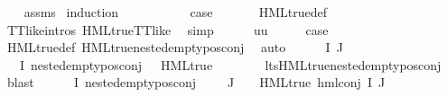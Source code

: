 \begin{isabellebody}
\ \ \isamarkupfalse%
\ assms\ \isamarkupfalse%
{\isacharparenleft}{\kern0pt}induction\ {\isasymphi}{\isacharparenright}{\kern0pt}\isanewline
\ \ \isamarkupfalse%
\ {}\isanewline
\ \ \isamarkupfalse%
\ \isamarkupfalse%
\ {\isacharquery}{\kern0pt}case\ \isanewline
\ \ \ \ \isamarkupfalse%
\ HML{\isacharunderscore}{\kern0pt}true{\isacharunderscore}{\kern0pt}def\isanewline
\ \ \ \ \isamarkupfalse%
\ TT{\isacharunderscore}{\kern0pt}like{\isachardot}{\kern0pt}intros{\isacharparenleft}{\kern0pt}{}{\isacharparenright}{\kern0pt}\ HML{\isacharunderscore}{\kern0pt}true{\isacharunderscore}{\kern0pt}TT{\isacharunderscore}{\kern0pt}like\ \isamarkupfalse%
\ simp\isanewline
{}\isamarkupfalse%
\isanewline
\ \ \isamarkupfalse%
\ {\isacharparenleft}{\kern0pt}{}\ {\isasympsi}\ uu{\isacharparenright}{\kern0pt}\isanewline
\ \ \isamarkupfalse%
\ \isamarkupfalse%
\ {\isacharquery}{\kern0pt}case\ \isanewline
\ \ \ \ \isamarkupfalse%
\ HML{\isacharunderscore}{\kern0pt}true{\isacharunderscore}{\kern0pt}def\ HML{\isacharunderscore}{\kern0pt}true{\isacharunderscore}{\kern0pt}nested{\isacharunderscore}{\kern0pt}empty{\isacharunderscore}{\kern0pt}pos{\isacharunderscore}{\kern0pt}conj\ \isamarkupfalse%
\ auto\isanewline
{}\isamarkupfalse%
\isanewline
\ \ \isamarkupfalse%
\ {\isacharparenleft}{\kern0pt}{}\ {\isasymPhi}\ I\ J{\isacharparenright}{\kern0pt}\isanewline
\ \ \isamarkupfalse%
\ {\isachardoublequoteopen}{\isacharparenleft}{\kern0pt}{\isasymforall}{\isasympsi}{\isasymin}{\isasymPhi}\ {\isacharbackquote}{\kern0pt}\ I{\isachardot}{\kern0pt}\ nested{\isacharunderscore}{\kern0pt}empty{\isacharunderscore}{\kern0pt}pos{\isacharunderscore}{\kern0pt}conj\ {\isasympsi}\ {\isasymlongrightarrow}\ HML{\isacharunderscore}{\kern0pt}true\ {\isasympsi}{\isacharparenright}{\kern0pt}{\isachardoublequoteclose}\ \isanewline
\ \ \ \ \isamarkupfalse%
\ lts{\isachardot}{\kern0pt}HML{\isacharunderscore}{\kern0pt}true{\isacharunderscore}{\kern0pt}nested{\isacharunderscore}{\kern0pt}empty{\isacharunderscore}{\kern0pt}pos{\isacharunderscore}{\kern0pt}conj\ \isamarkupfalse%
\ blast\isanewline
\ \ \isamarkupfalse%
\ {\isachardoublequoteopen}{\isacharparenleft}{\kern0pt}{\isacharparenleft}{\kern0pt}{\isasymforall}{\isasympsi}{\isasymin}{\isasymPhi}\ {\isacharbackquote}{\kern0pt}\ I{\isachardot}{\kern0pt}\ nested{\isacharunderscore}{\kern0pt}empty{\isacharunderscore}{\kern0pt}pos{\isacharunderscore}{\kern0pt}conj\ {\isasympsi}{\isacharparenright}{\kern0pt}\ {\isasymand}\ {\isasymPhi}\ {\isacharbackquote}{\kern0pt}\ J\ {\isacharequal}{\kern0pt}\ {\isacharbraceleft}{\kern0pt}{\isacharbraceright}{\kern0pt}{\isacharparenright}{\kern0pt}\ {\isasymlongrightarrow}\ HML{\isacharunderscore}{\kern0pt}true\ {\isacharparenleft}{\kern0pt}hml{\isacharunderscore}{\kern0pt}conj\ I\ J\ {\isasymPhi}{\isacharparenright}{\kern0pt}{\isachardoublequoteclose}\isanewline

\end{isabellebody}
